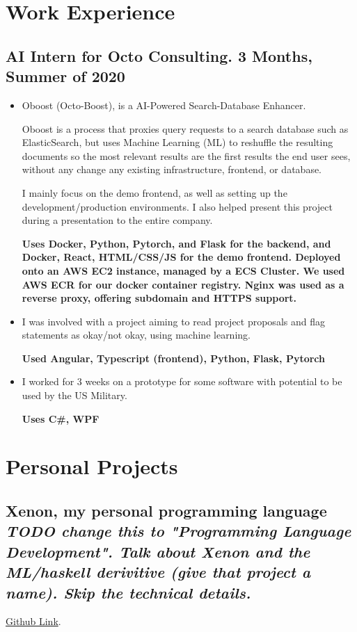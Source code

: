 \documentclass[10pt,letterpaper]{article}
\def\link#1#2{\color{blue!60!black}\href{#1}{#2}\color{black}}
\newcommand{\Csh}{C\#}
\def\paddedItem#1{\vspace{-0.4em}\item #1}
\begin{document}
    \section*{Work Experience}
    \subsection*{AI Intern for Octo Consulting. 3 Months, Summer of 2020}
    \begin{itemize}
        \paddedItem Oboost (Octo-Boost), is a AI-Powered Search-Database Enhancer.

        \hspace{24px} Oboost is a process that proxies query requests to a search database such as ElasticSearch,
        but uses Machine Learning (ML) to reshuffle the resulting documents so the most relevant results
        are the first results the end user sees, without any change any existing infrastructure, frontend, or database.
        
        \hspace{24px} I mainly focus on the demo frontend, as well as setting up the development/production environments. 
        I also helped present this project during a presentation to the entire company. 

        \textbf{Uses Docker, Python, Pytorch, and Flask for the backend, and Docker, React, HTML/CSS/JS for the demo frontend.
        Deployed onto an AWS EC2 instance, managed by a ECS Cluster. We used AWS ECR for our docker container registry.
        Nginx was used as a reverse proxy, offering subdomain and HTTPS support.}

        \paddedItem I was involved with a project aiming to read project proposals and flag statements as okay/not okay,
            using machine learning.
        
        \textbf{Used Angular, Typescript (frontend), Python, Flask, Pytorch}
 

        \paddedItem I worked for 3 weeks on a prototype for some software with potential to be used by the US Military. 
        
        \textbf{Uses \Csh, WPF}
    \end{itemize}
    
    \section*{Personal Projects}


    \subsection*{Xenon, my personal programming language \textit{TODO change this to "Programming Language Development". Talk about Xenon and the ML/haskell derivitive (give that project a name). Skip the technical details.}}
    \link{https://github.com/Mee42/Xenon}{Github Link}.
    
\end{document}
